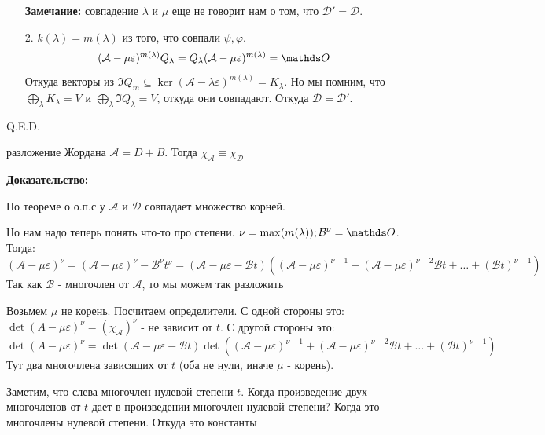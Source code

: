 \begin{enumerate}
    \textbf{Замечание:} совпадение  $\lambda$ и $\mu$ еще не говорит нам о том, что $\mathcal{D}' = \mathcal{D}$.
    \item[2.] $k(\lambda) = m(\lambda)$ из того, что совпали $\psi, \varphi$.
    $$(\mathcal{A}-\mu\varepsilon)^{m(\lambda)}Q_{\lambda} =Q_{\lambda}(\mathcal{A}-\mu\varepsilon)^{m(\lambda)} =\zero$$
    Откуда векторы из $\Im Q_{m} \subseteq \ker (\mathcal{A}-\lambda\varepsilon)^{m(\lambda)} = K_{\lambda}$. Но мы помним, что $\bigoplus\limits_{\lambda}K_{\lambda} = V$ и  $\bigoplus\limits_{\lambda}\Im Q_{\lambda} = V$, откуда они совпадают. Откуда $\mathcal{D} = \mathcal{D}'$.
\end{enumerate}


 \hfill Q.E.D.
















разложение Жордана $\mathcal{A} = D + B$. Тогда
$\chi_{\mathcal{A}}\equiv \chi_\mathcal{D}$

\textbf{Доказательство:}

По теореме о о.п.с у $\mathcal{A}$ и $\mathcal{D}$ совпадает множество корней. 

Но нам надо теперь понять что-то про степени. $\nu = \max(m(\lambda)); \mathcal{B}^\nu = \zero$. Тогда:
$$(\mathcal{A}-\mu \varepsilon)^{\nu}=(\mathcal{A}-\mu \varepsilon)^{\nu} - \mathcal{B}^\nu t^\nu = (\mathcal{A-\mu \varepsilon-\mathcal{B}}t)((\mathcal{A}-\mu\varepsilon)^{\nu-1}+ (\mathcal{A}-\mu\varepsilon)^{\nu-2}\mathcal{B}t + \ldots + (\mathcal{B}t)^{\nu-1})$$
Так как $\mathcal{B}$ - многочлен от $\mathcal{A}$, то мы можем так разложить

Возьмем $\mu$ не корень. Посчитаем определители. С одной стороны это:
$\det (A-\mu \varepsilon)^\nu = (\chi_{\mathcal{A}})^\nu$  - не зависит от $t$.
С другой стороны это:
$$\det (A-\mu \varepsilon)^\nu = \det(\mathcal{A-\mu \varepsilon-\mathcal{B}}t)\det ((\mathcal{A}-\mu\varepsilon)^{\nu-1}+ (\mathcal{A}-\mu\varepsilon)^{\nu-2}\mathcal{B}t + \ldots + (\mathcal{B}t)^{\nu-1})$$
Тут два многочлена зависящих от $t$ (оба не нули, иначе $\mu$ - корень).

Заметим, что слева многочлен нулевой степени $t$. Когда произведение двух многочленов от $t$ дает в произведении многочлен нулевой степени? Когда это многочлены нулевой степени. Откуда это константы

